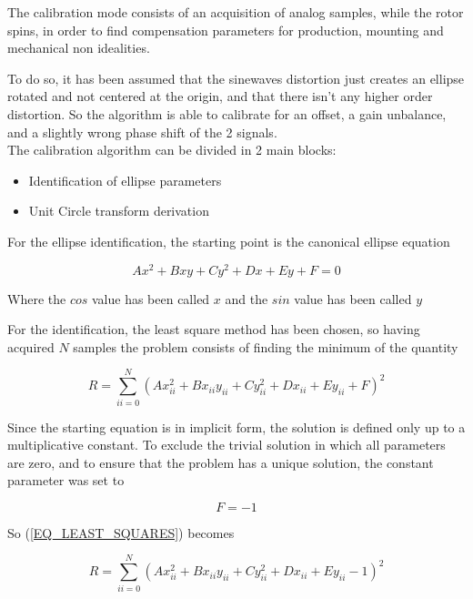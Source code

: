 \documentclass[main]{subfiles}
\begin{document}
The calibration mode consists of an acquisition of analog samples, while the rotor 
spins, in order to find compensation parameters for production, mounting and mechanical
non idealities.

To do so, it has been assumed that the sinewaves distortion just creates an ellipse
rotated and not centered at the origin, and that there isn't any higher order 
distortion.
So the algorithm is able to calibrate for an offset, a gain unbalance, and a slightly 
wrong phase shift of the 2 signals.\\

The calibration algorithm can be divided in 2 main blocks:
\begin{itemize}
    \item Identification of ellipse parameters
    \item Unit Circle transform derivation
\end{itemize}

For the ellipse identification, the starting point is the canonical ellipse equation

\begin{equation}
    A x^2 + B xy + C y^2 + D x + E y + F = 0 \label{EQ_ELLIPSE_CANONICAL}
\end{equation}

Where the {\bf$cos$} value has been called {\bf $x$} and the {\bf $sin$} value 
has been called {\bf $y$}

For the identification, the least square method has been chosen, so having acquired
$N$ samples the problem consists of finding the minimum of the quantity

\begin{equation}
    R = \sum_{ii=0}^{N} \left(A x_{ii}^2 + B x_{ii}y_{ii} + C y_{ii}^2 + D x_{ii} + E y_{ii} + F\right)^2
    \label{EQ_LEAST_SQUARES}
\end{equation}

Since the starting equation is in implicit form, the solution is defined only up 
to a multiplicative constant. 
To exclude the trivial solution in which all parameters are zero, and to ensure 
that the problem has a unique solution, the constant parameter was set to 

\begin{equation}
    F = -1
\end{equation}

So (\ref{EQ_LEAST_SQUARES}) becomes

\begin{equation}
    R = \sum_{ii=0}^{N} \left(A x_{ii}^2 + B x_{ii}y_{ii} + C y_{ii}^2 + D x_{ii} + E y_{ii} -1\right)^2
    \label{EQ_LEAST_SQUARES_FORCED}
\end{equation}
\end{document}
